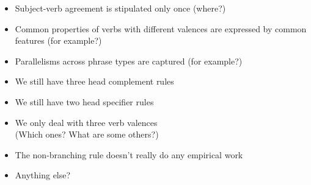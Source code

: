 \documentclass[a4paper,landscape,headrule,footrule]{foils}
\begin{document}
\begin{itemize}
\item Subject-verb agreement is stipulated only
once (where?)
\item Common properties of verbs with different
valences are expressed by common features
(for example?)
\item Parallelisms across phrase types are captured
(for example?)
\end{itemize}

\begin{itemize}
\item We still have three head complement rules
\item We still have two head specifier rules
\item We only deal with three verb valences
\\ (Which ones? What are some others?)
\item The non-branching rule doesn’t really do any
empirical work
\item Anything else?
\end{itemize}



\end{document}
